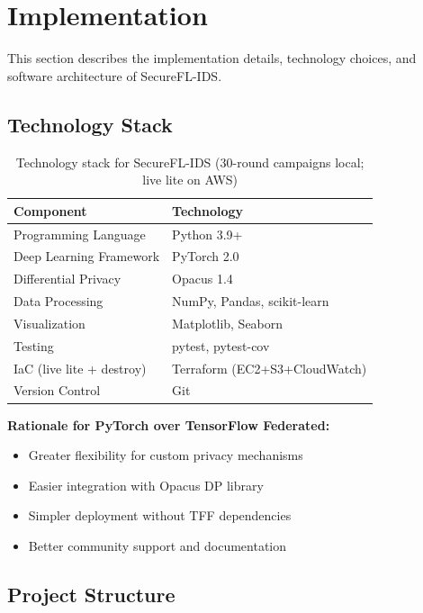 \section{Implementation}
\label{sec:implementation}

This section describes the implementation details, technology choices, and software architecture of SecureFL-IDS.

\subsection{Technology Stack}

\begin{table}[h]
\centering
\begin{tabular}{ll}
\toprule
\textbf{Component} & \textbf{Technology} \\
\midrule
Programming Language & Python 3.9+ \\
Deep Learning Framework & PyTorch 2.0 \\
Differential Privacy & Opacus 1.4 \\
Data Processing & NumPy, Pandas, scikit-learn \\
Visualization & Matplotlib, Seaborn \\
Testing & pytest, pytest-cov \\
IaC (live lite + destroy) & Terraform (EC2+S3+CloudWatch) \\
Version Control & Git \\
\bottomrule
\end{tabular}
\caption{Technology stack for SecureFL-IDS (30-round campaigns local; live lite on AWS)}
\label{tab:tech_stack}
\end{table}

\textbf{Rationale for PyTorch over TensorFlow Federated:}

\begin{itemize}
    \item Greater flexibility for custom privacy mechanisms
    \item Easier integration with Opacus DP library
    \item Simpler deployment without TFF dependencies
    \item Better community support and documentation
\end{itemize}

\subsection{Project Structure}

